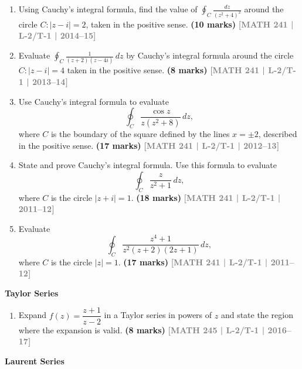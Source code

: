 \documentclass[12pt,a3paper]{article}
\newcommand{\yr}[1]{\hfill\textcolor{gray}{\small\textbf{[#1]}}}
\newcommand{\mk}[1]{\textcolor{orange!70!black}{\small\textbf{(#1 marks)}}}
\newcommand{\subtopic}[2]{%
  \vspace{10pt}
  \noindent\begin{tcolorbox}[colback=#1!8,colframe=#1,boxrule=0.6pt,arc=4pt,
    left=6pt,right=6pt,top=4pt,bottom=4pt]
    \small\bfseries\textcolor{#1}{#2}
  \end{tcolorbox}
  \vspace{2pt}
}
\begin{document}
\begin{enumerate}
\item Using Cauchy's integral formula, find the value of $\displaystyle\oint_{C}\frac{dz}{(z^{2}+4)^{2}}$ around the circle $C\colon|z-i|=2$, taken in the positive sense.
\mk{10} \yr{MATH 241 | L-2/T-1 | 2014--15}


\item Evaluate $\displaystyle\oint_{C} \frac{1}{(z+2)(z-4i)}\,dz$ by Cauchy's integral formula around the circle $C\colon |z-i|=4$ taken in the positive sense.
\mk{8} \yr{MATH 241 | L-2/T-1 | 2013--14}


\item Use Cauchy's integral formula to evaluate
\[
\oint_{C} \frac{\cos z}{z(z^{2}+8)}\,dz,
\]
where $C$ is the boundary of the square defined by the lines $x=\pm 2$, described in the positive sense.
\mk{17} \yr{MATH 241 | L-2/T-1 | 2012--13}


\item State and prove Cauchy's integral formula. Use this formula to evaluate
\[
\oint_{C} \frac{z}{z^{2}+1}\,dz,
\]
where $C$ is the circle $|z+i|=1$.
\mk{18} \yr{MATH 241 | L-2/T-1 | 2011--12}


\item Evaluate
\[
\oint_{C} \frac{z^{4}+1}{z^{2}(z+2)(2z+1)}\,dz,
\]
where $C$ is the circle $|z|=1$.
\mk{17} \yr{MATH 241 | L-2/T-1 | 2011--12}


\end{enumerate}

\subtopic{cE}{Taylor Series}
\label{sub:s5-taylor}

\begin{enumerate}
    
\item Expand $f(z)=\dfrac{z+1}{z-2}$ in a Taylor series in powers of $z$ and state the region where the expansion is valid.
\mk{8} \yr{MATH 245 | L-2/T-1 | 2016--17}


\end{enumerate}
  
\subtopic{cE}{Laurent Series}
\label{sub:s5-laurent}
\end{document}
